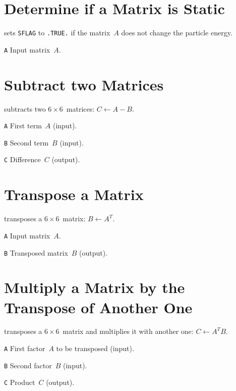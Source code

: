 \section{Determine if a Matrix is Static}
\label{M66STA}
sets {\tt SFLAG} to {\tt .TRUE.} if the matrix~$A$ does not change
the particle energy.
\begin{mylist}
\item[\tt A]
Input matrix~$A$.
\end{mylist}

\section{Subtract two Matrices}
\label{M66SUB}
subtracts two $6 \times 6$~matrices: $C \leftarrow A - B$.
\begin{mylist}
\item[\tt A]
First term~$A$ (input).                        
\item[\tt B]
Second term~$B$ (input).
\item[\tt C]
Difference~$C$ (output).
\end{mylist}

\section{Transpose a Matrix}
\label{M66TP}
transposes a $6 \times 6$~matrix: $B \leftarrow A^T$.
\begin{mylist}
\item[\tt A]
Input matrix~$A$.
\item[\tt B]
Transposed matrix~$B$ (output).
\end{mylist}

\section{Multiply a Matrix by the Transpose of Another One}
\label{M66TRM}
transposes a $6 \times 6$~matrix and multiplies it with another one:
$C \leftarrow A^T B$.
\begin{mylist}
\item[\tt A]
First factor~$A$ to be transposed (input).
\item[\tt B]
Second factor~$B$ (input).
\item[\tt C]
Product~$C$ (output).
\end{mylist}

